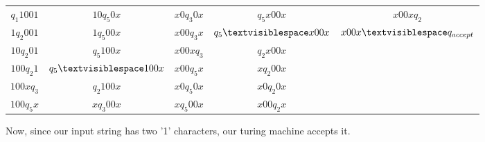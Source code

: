 \documentclass{article}
\begin{document}
\begin{exmp}
\begin{center}
\begin{tabular}{ c c c c c }
	$q_{1}1001$ & $10q_{5}0x$ & $x0q_{3}0x$ & $q_{5}x00x$ & $x00xq_{2}$ \\
	$1q_{2}001$ & $1q_{5}00x$ & $x00q_{3}x$ & $q_{5} \textvisiblespace x00x$ & $x00x \textvisiblespace q_{accept}$ \\
	$10q_{2}01$ & $q_{5}100x$ & $x00xq_{3}$ & $q_{2}x00x$\\
	$100q_{2}1$ & $q_{5} \textvisiblespace 100x$ & $x00q_{5}x$ & $xq_{2}00x$\\
	$100xq_{3}$ & $q_{2}100x$ & $x0q_{5}0x$ & $x0q_{2}0x$\\
	$100q_{5}x$ & $xq_{3}00x$ & $xq_{5}00x$ & $x00q_{2}x$
\end{tabular}
\end{center}
\end{exmp}
\noindent Now, since our input string has two '1' characters, our turing machine accepts it. \cite{2}
\end{document}
